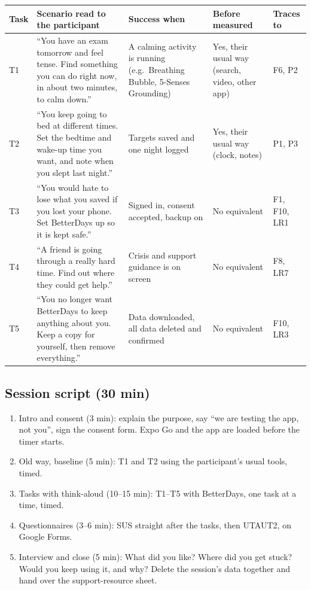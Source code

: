 \documentclass{article}
\begin{document}
\begin{center}
\small
\begin{tabularx}{\linewidth}{|L{0.7cm}|Y|L{3.3cm}|L{2.3cm}|L{1.6cm}|}
\hline
\textbf{Task} & \textbf{Scenario read to the participant} & \textbf{Success when} & \textbf{Before measured} & \textbf{Traces to} \\ \hline
T1 & ``You have an exam tomorrow and feel tense. Find something you can do right now, in about two minutes, to calm down.'' & A calming activity is running (e.g.\ Breathing Bubble, 5-Senses Grounding) & Yes, their usual way (search, video, other app) & F6, P2 \\ \hline
T2 & ``You keep going to bed at different times. Set the bedtime and wake-up time you want, and note when you slept last night.'' & Targets saved and one night logged & Yes, their usual way (clock, notes) & P1, P3 \\ \hline
T3 & ``You would hate to lose what you saved if you lost your phone. Set BetterDays up so it is kept safe.'' & Signed in, consent accepted, backup on & No equivalent & F1, F10, LR1 \\ \hline
T4 & ``A friend is going through a really hard time. Find out where they could get help.'' & Crisis and support guidance is on screen & No equivalent & F8, LR7 \\ \hline
T5 & ``You no longer want BetterDays to keep anything about you. Keep a copy for yourself, then remove everything.'' & Data downloaded, all data deleted and confirmed & No equivalent & F10, LR3 \\ \hline
\end{tabularx}
\end{center}

\subsection{Session script (30 min)}

\begin{enumerate}
\item Intro and consent (3 min): explain the purpose, say ``we are testing the app, not you'', sign the consent form. Expo Go and the app are loaded before the timer starts.
\item Old way, baseline (5 min): T1 and T2 using the participant's usual tools, timed.
\item Tasks with think-aloud (10--15 min): T1--T5 with BetterDays, one task at a time, timed.
\item Questionnaires (3--6 min): SUS straight after the tasks, then UTAUT2, on Google Forms.
\item Interview and close (5 min): What did you like? Where did you get stuck? Would you keep using it, and why? Delete the session's data together and hand over the support-resource sheet.
\end{enumerate}
\end{document}
